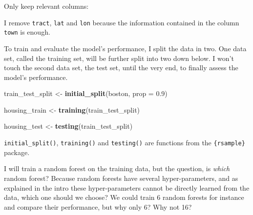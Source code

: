 \documentclass[]{gitbook}
\newenvironment{Shaded}{\begin{snugshade}}{\end{snugshade}}
\newcommand{\DataTypeTok}[1]{\textcolor[rgb]{0.13,0.29,0.53}{#1}}
\newcommand{\FloatTok}[1]{\textcolor[rgb]{0.00,0.00,0.81}{#1}}
\newcommand{\KeywordTok}[1]{\textcolor[rgb]{0.13,0.29,0.53}{\textbf{#1}}}
\newcommand{\NormalTok}[1]{#1}
\newcommand{\OperatorTok}[1]{\textcolor[rgb]{0.81,0.36,0.00}{\textbf{#1}}}
\newcommand{\StringTok}[1]{\textcolor[rgb]{0.31,0.60,0.02}{#1}}
\begin{document}
Only keep relevant columns:

\begin{Shaded}
\end{Shaded}

I remove \texttt{tract}, \texttt{lat} and \texttt{lon} because the information contained in the column \texttt{town} is enough.

To train and evaluate the model's performance, I split the data in two.
One data set, called the training set, will be further split into two down below. I won't
touch the second data set, the test set, until the very end, to finally assess the model's
performance.

\begin{Shaded}
\begin{Highlighting}[]
\NormalTok{train_test_split <-}\StringTok{ }\KeywordTok{initial_split}\NormalTok{(boston, }\DataTypeTok{prop =} \FloatTok{0.9}\NormalTok{)}

\NormalTok{housing_train <-}\StringTok{ }\KeywordTok{training}\NormalTok{(train_test_split)}

\NormalTok{housing_test <-}\StringTok{ }\KeywordTok{testing}\NormalTok{(train_test_split)}
\end{Highlighting}
\end{Shaded}

\texttt{initial\_split()}, \texttt{training()} and \texttt{testing()} are functions from the \texttt{\{rsample\}} package.

I will train a random forest on the training data, but the question, is \emph{which} random forest?
Because random forests have several hyper-parameters, and as explained in the intro these
hyper-parameters cannot be directly learned from the data, which one should we choose? We could
train 6 random forests for instance and compare their performance, but why only 6? Why not 16?
\end{document}
